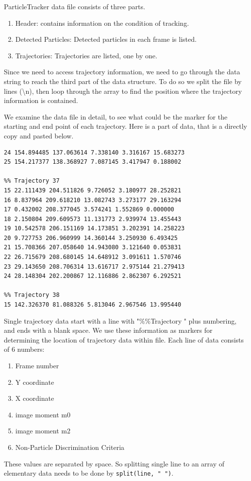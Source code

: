 \documentclass[11pt,a4paper,oneside]{report}
\newcommand{\ilcom}[1]{\texttt{\small#1}}
\begin{document}
ParticleTracker data file consists of three parts. 
\begin{enumerate}
\item Header: contains information on the condition of tracking. 
\item Detected Particles: Detected particles in each frame is listed.
\item Trajectories: Trajectories are listed, one by one. 
\end{enumerate}
Since we need to access trajectory information, we need to go through the data string to reach the third part of the data structure. To do so we split the file by lines (\textbackslash{}n), then loop through the array to find the position where the trajectory information is contained. 

We examine the data file in detail, to see what could be the marker for the starting and end point of each trajectory. Here is a part of data, that is a directly copy and pasted below. 
\begin{lstlisting}[numbers=none]
24 154.894485 137.063614 7.338140 3.316167 15.683273
25 154.217377 138.368927 7.087145 3.417947 0.188002

%% Trajectory 37
15 22.111439 204.511826 9.726052 3.180977 28.252821
16 8.837964 209.618210 13.082743 3.273177 29.163294
17 0.432002 208.377045 3.574241 1.552869 0.000000
18 2.150804 209.609573 11.131773 2.939974 13.455443
19 10.542578 206.151169 14.173851 3.202391 14.258223
20 9.727753 206.960999 14.360144 3.250930 6.493425
21 15.708366 207.058640 14.943080 3.121640 0.053831
22 26.715679 208.680145 14.648912 3.091611 1.570746
23 29.143650 208.706314 13.616717 2.975144 21.279413
24 28.148304 202.200867 12.116886 2.862307 6.292521

%% Trajectory 38
15 142.326370 81.088326 5.813046 2.967546 13.995440
\end{lstlisting}
Single trajectory data start with a line with "\%\%Trajectory " plus numbering, and ends with a blank space. We use these information as markers for determining the location of trajectory data within file. Each line of data consists of 6 numbers: 
\begin{enumerate} 
\item Frame number
\item Y coordinate
\item X coordinate
\item image moment m0
\item image moment m2
\item Non-Particle Discrimination Criteria
\end{enumerate}
These values are separated by space. So splitting single line to an array of elementary data needs to be done by \ilcom{split(line, " ")}.
\end{document}
